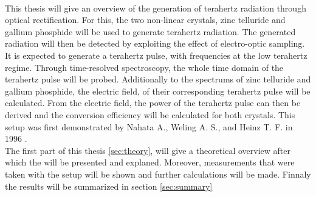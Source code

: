 \\
This thesis will give an overview of the generation of terahertz radiation through optical rectification.
For this, the two non-linear crystals, zinc telluride and gallium phosphide will be used to generate terahertz radiation.
The generated radiation will then be detected by exploiting the effect of electro-optic sampling.
\\
It is expected to generate a terahertz pulse, with frequencies at the low terahertz regime.
Through time-resolved spectroscopy, the whole time domain of the terahertz pulse will be probed.
Additionally to the spectrums of zinc telluride and gallium phosphide, the electric field, of their corresponding terahertz pulse will be calculated.
From the electric field, the power of the terahertz pulse can then be derived and the conversion efficiency will be calculated for both crystals.
This setup was first demonstrated by Nahata A., Weling A. S., and Heinz T. F. in 1996 \cite{ZnTe_Nahata_Weling_1996}.
\\
The first part of this thesis \ref{sec:theory}, will give a theoretical overview after which the  will be presented and explaned.
Moreover, measurements that were taken with the setup will be shown and further calculations will be made.
Finnaly the results will be summarized in section \ref{sec:summary}




